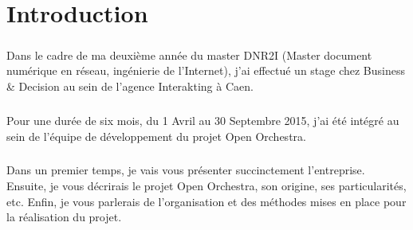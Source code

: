 \chapter*{Introduction}
        \paragraph{}
         Dans le cadre de ma deuxième année du master DNR2I (Master document numérique en réseau, ingénierie de l'Internet), j'ai effectué un stage chez Business \& Decision au sein de l'agence Interakting à Caen.
         \paragraph{}
          Pour une durée de six mois, du 1 Avril au 30 Septembre 2015, j'ai été intégré au sein de l'équipe de développement du projet Open Orchestra.
         \paragraph{}
         Dans un premier temps, je vais vous présenter succinctement l'entreprise. Ensuite, je vous décrirais le projet Open Orchestra, son origine, ses particularités, etc. Enfin, je vous parlerais de l'organisation et des méthodes mises en place pour la réalisation du projet.
